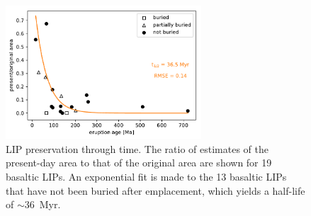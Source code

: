 \documentclass[11pt,letterpaper]{article}
\begin{document}
\begin{figure}[h!]
\begin{center}
	\includegraphics[width=0.65\textwidth]{Manuscript/Figures/LIP_Preservation.pdf}
	\caption{LIP preservation through time. The ratio of estimates of the present-day area to that of the original area are shown for 19 basaltic LIPs. An exponential fit is made to the 13 basaltic LIPs that have not been buried after emplacement, which yields a half-life of $\sim$36~Myr.}
	\label{fig:LIP_preservation}
\end{center}
\end{figure}
\end{document}
